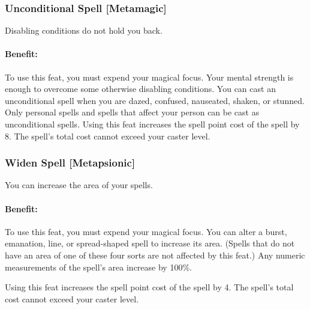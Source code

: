 \subsubsection[Unconditional Spell]{Unconditional Spell [Metamagic]}
\label{Feat:UnconditionalSpell}
Disabling conditions do not hold you back.

\paragraph{Benefit:} To use this feat, you must expend your magical focus. Your mental strength is enough to overcome some otherwise disabling conditions. You can cast an unconditional spell when you are dazed, confused, nauseated, shaken, or stunned.
Only personal spells and spells that affect your person can be cast as unconditional spells.
Using this feat increases the spell point cost of the spell by 8. The spell's total cost cannot exceed your caster level.

\subsubsection[Widen Spell]{Widen Spell [Metapsionic]}
\label{Feat:WidenSpell}
You can increase the area of your spells.

\paragraph{Benefit:}
To use this feat, you must expend your magical focus. 
You can alter a burst, emanation, line, or spread-shaped spell to increase its area. (Spells that do not have an area of one of these four sorts are not affected by this feat.) Any numeric measurements of the spell's area increase by 100\%.

Using this feat increases the spell point cost of the spell by 4. The spell's total cost cannot exceed your caster level.